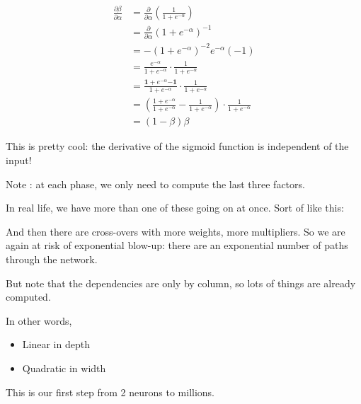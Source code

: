 \begin{align*}
  \frac{\partial\beta}{\partial\alpha}
  & = \frac{\partial}{\partial\alpha} \left( \frac{1}{1+e^{-\alpha}} \right) \\[3mm]
  & = \frac{\partial}{\partial\alpha} \left(1+e^{-\alpha}\right)^{-1} \\[3mm]
  & = -\left(1+e^{-\alpha}\right)^{-2} e^{-\alpha} (-1) \\[3mm]
  & = \frac{e^{-\alpha}}{1+e^{-\alpha}} \cdot \frac{1}{1+e^{-\alpha}} \\[3mm]
  & = \frac{\mathbf{1+} e^{-\alpha} \mathbf{-1}}{1+e^{-\alpha}} \cdot \frac{1}{1+e^{-\alpha}} \\[3mm]
  & = \left(\frac{1+e^{-\alpha}}{1+e^{-\alpha}} - \frac{1}{1+e^{-\alpha}}\right)
    \cdot \frac{1}{1+e^{-\alpha}} \\[3mm]
  & = (1-\beta)\beta
\end{align*}

This is pretty cool: the derivative of the sigmoid function is independent of the input!

Note : at each phase, we only need to compute the last three factors.



In real life, we have more than one of these going on at once.  Sort of like this:



And then there are cross-overs with more weights, more multipliers.
So we are again at risk of exponential blow-up: there are an
exponential number of paths through the network.

But note that the dependencies are only by column, so lots of things
are already computed.

In other words,
\begin{itemize}
\item Linear in depth
\item Quadratic in width
\end{itemize}



This is our first step from 2 neurons to millions.

